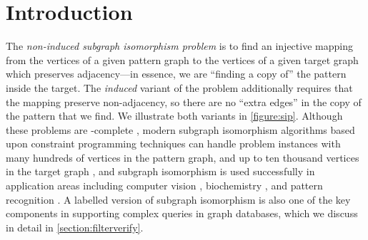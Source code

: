 \documentclass[twoside,11pt]{article}
\begin{document}
\section{Introduction}\label{section:introduction}

The \emph{non-induced subgraph isomorphism problem} is to find an injective mapping from the
vertices of a given pattern graph to the vertices of a given target graph which preserves
adjacency---in essence, we are ``finding a copy of'' the pattern inside the target. The
\emph{induced} variant of the problem additionally requires that the mapping preserve non-adjacency,
so there are no ``extra edges'' in the copy of the pattern that we find. We illustrate both variants
in \cref{figure:sip}.  Although these problems are \NP-complete \cite{DBLP:books/fm/GareyJ79}, modern subgraph
isomorphism algorithms based upon constraint programming techniques can handle problem instances
with many hundreds of vertices in the pattern graph, and up to ten thousand vertices in the target
graph
\cite{DBLP:journals/ai/Solnon10,DBLP:conf/cp/AudemardLMGP14,DBLP:conf/cp/McCreeshP15,DBLP:conf/lion/KotthoffMS16},
and subgraph isomorphism is used successfully in application areas including computer vision
\cite{DBLP:journals/cviu/DamiandSHJS11,DBLP:journals/pr/SolnonDHJ15}, biochemistry
\cite{o:10.1371/journal.pone.0076911,DBLP:conf/gbrpr/CarlettiFV15}, and pattern recognition
\cite{DBLP:journals/ijprai/ConteFSV04}.  A labelled version of subgraph isomorphism
is also one of the key components in supporting complex queries in graph databases, which we discuss in
detail in \cref{section:filterverify}.
\end{document}
